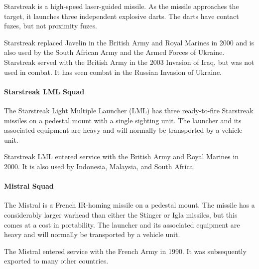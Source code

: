 Starstreak is a high-speed laser-guided missile. As the missile approaches the target, it launches three independent explosive darts. The darts have contact fuzes, but not proximity fuzes.%

Starstreak replaced Javelin in the British Army and Royal Marines in 2000 and is also used by the South African Army and the Armed Forces of Ukraine.
Starstreak served with the British Army in the 2003 Invasion of Iraq, but was not used in combat. It has seen combat in the Russian Invasion of Ukraine.

\paragraph{Starstreak LML Squad}

The Starstreak Light Multiple Launcher (LML) has three ready-to-fire Starstreak missiles on a pedestal mount with a single sighting unit. The launcher and its associated equipment are heavy and will normally be transported by a vehicle unit.%

Starstreak LML entered service with the British Army and Royal Marines in 2000.
It is also used by Indonesia, Malaysia, and South Africa.

\paragraph{Mistral Squad}

The Mistral is a French IR-homing missile on a pedestal mount. The missile has a considerably larger warhead than either the Stinger or Igla missiles, but this comes at a cost in portability. The launcher and its associated equipment are heavy and will normally be transported by a vehicle unit.%

The Mistral entered service with the French Army in 1990. It was subsequently exported to many other countries.

